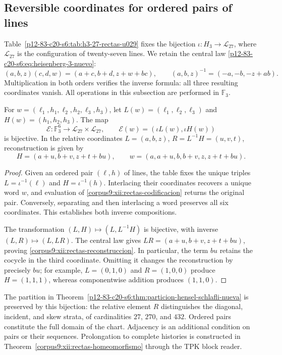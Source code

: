 \subsection{Reversible coordinates for ordered pairs of lines}
\label{corpus9:xii:rectas-coordenadas}

Table~\ref{p12-83-c20-s6:tab:h3-27-rectas-u029} fixes the bijection
\(\iota:H_3\to\mathscr L_{27}\), where \(\mathscr L_{27}\) is the
configuration of twenty-seven lines. We retain the central law
\eqref{p12-83-c20-s6:eq:heisenberg-3-nuevo}:
\[
 (a,b,z)(c,d,w)=(a+c,b+d,z+w+bc),\qquad
 (a,b,z)^{-1}=(-a,-b,-z+ab).
\]
Multiplication in both orders verifies the inverse formula: all three
resulting coordinates vanish. All operations in this subsection are
performed in \(\mathbb F_3\).

\begin{proposition}
\label{corpus9:xii:rectas-biyeccion}
For \(w=(\ell_1,h_1,\ell_2,h_2,\ell_3,h_3)\), let
\(L(w)=(\ell_1,\ell_2,\ell_3)\) and
\(H(w)=(h_1,h_2,h_3)\). The map
\begin{equation}
 \mathcal E:\mathbb F_3^6\longrightarrow
                 \mathscr L_{27}\times\mathscr L_{27},\qquad
 \mathcal E(w)=(\iota L(w),\iota H(w))
 \label{corpus9:xii:rectas-codificacion}
\end{equation}
is bijective. In the relative coordinates
\(L=(a,b,z)\), \(R=L^{-1}H=(u,v,t)\), reconstruction is given by
\begin{equation}
 H=(a+u,b+v,z+t+bu),\qquad
 w=(a,a+u,b,b+v,z,z+t+bu).
 \label{corpus9:xii:rectas-reconstruccion}
\end{equation}
\end{proposition}
\begin{proof}
Given an ordered pair \((\ell,h)\) of lines, the table fixes the
unique triples \(L=\iota^{-1}(\ell)\) and
\(H=\iota^{-1}(h)\). Interlacing their coordinates recovers a unique
word \(w\), and evaluation of
\eqref{corpus9:xii:rectas-codificacion} returns the original pair.
Conversely, separating and then interlacing a word preserves all six
coordinates. This establishes both inverse compositions.

The transformation \((L,H)\mapsto(L,L^{-1}H)\) is bijective, with
inverse \((L,R)\mapsto(L,LR)\). The central law gives
\(LR=(a+u,b+v,z+t+bu)\), proving
\eqref{corpus9:xii:rectas-reconstruccion}. In particular, the term
\(bu\) retains the cocycle in the third coordinate. Omitting it changes
the reconstruction by precisely \(bu\); for example,
\(L=(0,1,0)\) and \(R=(1,0,0)\) produce
\(H=(1,1,1)\), whereas componentwise addition produces
\((1,1,0)\).
\end{proof}

The partition in
Theorem~\ref{p12-83-c20-s6:thm:particion-hensel-schlafli-nueva}
is preserved by this bijection: the relative element \(R\) distinguishes
the diagonal, incident, and skew strata, of cardinalities \(27\),
\(270\), and \(432\). Ordered pairs constitute the full domain of
the chart. Adjacency is an additional condition on pairs or their
sequences. Prolongation to complete histories is constructed in
Theorem~\ref{corpus9:xii:rectas-homeomorfismo} through the TPK block
reader.
